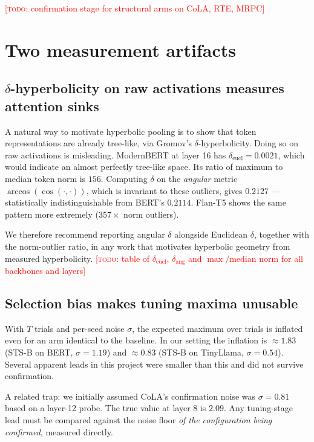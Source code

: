 \documentclass{article} %
\newcommand{\TODO}[1]{\textcolor{red}{[\textsc{todo}: #1]}}
\begin{document}
\TODO{confirmation stage for structural arms on CoLA, RTE, MRPC}

\section{Two measurement artifacts}
\label{sec:artifacts}

\subsection{$\delta$-hyperbolicity on raw activations measures attention sinks}
A natural way to motivate hyperbolic pooling is to show that token
representations are already tree-like, via Gromov's $\delta$-hyperbolicity.
Doing so on raw activations is misleading. ModernBERT at layer 16 has
$\delta_{\text{eucl}} = 0.0021$, which would indicate an almost perfectly
tree-like space. Its ratio of maximum to median token norm is $156$. Computing
$\delta$ on the \emph{angular} metric $\arccos(\cos(\cdot,\cdot))$, which is
invariant to these outliers, gives $0.2127$ --- statistically indistinguishable
from BERT's $0.2114$. Flan-T5 shows the same pattern more extremely
($357\times$ norm outliers).

We therefore recommend reporting angular $\delta$ alongside Euclidean $\delta$,
together with the norm-outlier ratio, in any work that motivates hyperbolic
geometry from measured hyperbolicity. \TODO{table of $\delta_{\text{eucl}}$,
$\delta_{\text{ang}}$ and $\max/\text{median}$ norm for all backbones and
layers}

\subsection{Selection bias makes tuning maxima unusable}
With $T$ trials and per-seed noise $\sigma$, the expected maximum over trials
is inflated even for an arm identical to the baseline. In our setting the
inflation is $\approx 1.83$ (STS-B on BERT, $\sigma = 1.19$) and $\approx 0.83$
(STS-B on TinyLlama, $\sigma = 0.54$). Several apparent leads in this project
were smaller than this and did not survive confirmation.

A related trap: we initially assumed CoLA's confirmation noise was
$\sigma = 0.81$ based on a layer-12 probe. The true value at layer 8 is
$2.09$. Any tuning-stage lead must be compared against the noise floor
\emph{of the configuration being confirmed}, measured directly.
\end{document}
